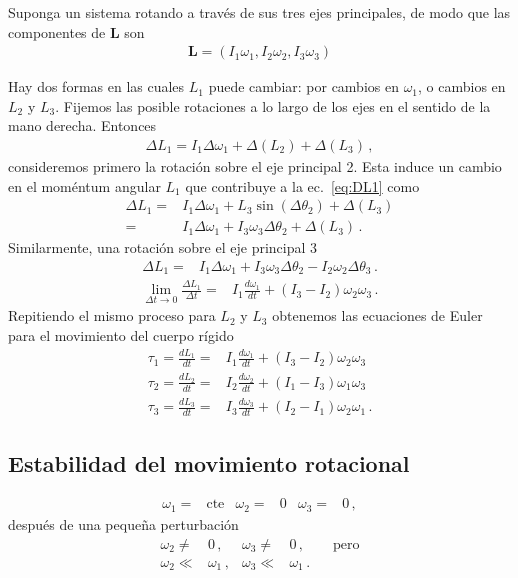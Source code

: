 Suponga un sistema rotando a través de sus tres ejes principales, de modo que las componentes de $\mathbf{L}$ son
\begin{align}
  \mathbf{L}=(I_1\omega_1,I_2\omega_2,I_3\omega_3)
\end{align}

Hay dos formas en las cuales $L_1$ puede cambiar: por cambios en $\omega_1$, o cambios en $L_2$ y $L_3$. Fijemos las posible rotaciones a lo largo de los ejes en el sentido de la mano derecha. Entonces
\begin{align}
  \label{eq:DL1}
  \Delta L_1=I_1\Delta\omega_1+\Delta(L_2)+\Delta(L_3)\,,
\end{align}
consideremos primero la rotación sobre el eje principal 2. Esta induce un cambio en el moméntum angular $L_1$ que contribuye a la ec.~\eqref{eq:DL1} como
\begin{align}
    \Delta L_1=&I_1\Delta\omega_1+L_3\sin(\Delta\theta_2)+\Delta(L_3)\nonumber\\
    =&I_1\Delta\omega_1+I_3\omega_3\Delta\theta_2+\Delta(L_3)\,.
\end{align}
Similarmente, una rotación sobre el eje principal 3
\begin{align}
    \Delta L_1=&I_1\Delta\omega_1+I_3\omega_3\Delta\theta_2-I_2\omega_2\Delta\theta_3\,.
\end{align}
\begin{align}
  \lim_{\Delta t\to 0}\frac{\Delta L_1}{\Delta t}=&
I_1\frac{d\omega_1}{dt}+(I_3-I_2)\omega_2\omega_3\,.
\end{align}
Repitiendo el mismo proceso para $L_2$ y $L_3$ obtenemos las ecuaciones de Euler para el movimiento del cuerpo rígido
\begin{align}
  \tau_1=\frac{dL_1}{dt}=&I_1\frac{d\omega_1}{dt}+(I_3-I_2)\omega_2\omega_3\nonumber\\
  \tau_2=\frac{dL_2}{dt}=&I_2\frac{d\omega_2}{dt}+(I_1-I_3)\omega_1\omega_3\nonumber\\
  \tau_3=\frac{dL_3}{dt}=&I_3\frac{d\omega_3}{dt}+(I_2-I_1)\omega_2\omega_1\,.
\end{align}
\subsection{Estabilidad del movimiento rotacional}
\begin{align}
\omega_1=&\text{cte}&   \omega_2=&0& \omega_3=&0\,,
\end{align}
después de una pequeña perturbación
\begin{align}
  \omega_2\ne&0\,,&\omega_3\ne&0\,,\qquad\text{pero}\nonumber\\
  \omega_2\ll& \omega_1 \,,&\omega_3\ll &\omega_1\,.
\end{align}

